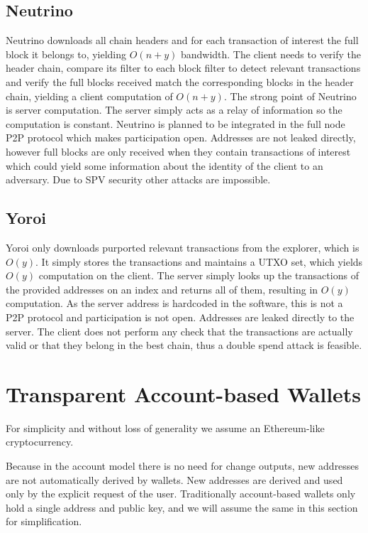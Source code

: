 \documentclass[sigconf,authordraft]{acmart}
\begin{document}
\subsection{Neutrino}
Neutrino downloads all chain headers and for each transaction of interest the full block it belongs to, yielding $O(n+y)$ bandwidth. The client needs to verify the header chain, compare its filter to each block filter to detect relevant transactions and verify the full blocks received match the corresponding blocks in the header chain, yielding a client computation of $O(n+y)$. The strong point of Neutrino is server computation. The server simply acts as a relay of information so the computation is constant. Neutrino is planned to be integrated in the full node P2P protocol which makes participation open. Addresses are not leaked directly, however full blocks are only received when they contain transactions of interest which could yield some information about the identity of the client to an adversary. Due to SPV security other attacks are impossible.

\subsection{Yoroi}
Yoroi only downloads purported relevant transactions from the explorer, which is $O(y)$. It simply stores the transactions and maintains a UTXO set, which yields $O(y)$ computation on the client. The server simply looks up the transactions of the provided addresses on an index and returns all of them, resulting in $O(y)$ computation. As the server address is hardcoded in the software, this is not a P2P protocol and participation is not open. Addresses are leaked directly to the server. The client does not perform any check that the transactions are actually valid or that they belong in the best chain, thus a double spend attack is feasible.

\section{Transparent Account-based Wallets}

For simplicity and without loss of generality we assume an Ethereum-like cryptocurrency.

Because in the account model there is no need for change outputs, new addresses are not automatically derived by wallets. New addresses are derived and used only by the explicit request of the user. Traditionally account-based wallets only hold a single address and public key, and we will assume the same in this section for simplification.
\end{document}
